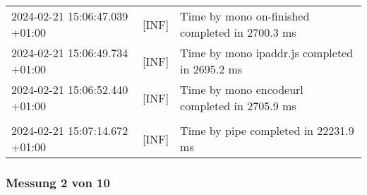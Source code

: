 {{\begin{tabularx}{\textwidth}{|l|l|X|}
                    2024-02-21 15:06:47.039 +01:00 & [INF] & Time by mono on-finished completed in 2700.3 ms \\
                    2024-02-21 15:06:49.734 +01:00 & [INF] & Time by mono ipaddr.js completed in 2695.2 ms \\
                    2024-02-21 15:06:52.440 +01:00 & [INF] & Time by mono encodeurl completed in 2705.9 ms \\
                    & & \\
                    2024-02-21 15:07:14.672 +01:00 & [INF] & Time by pipe completed in 22231.9 ms \\
                    \hline
                \end{tabularx}
            }
        }

    \subsubsection*{Messung 2 von 10} \label{subsubsec:LiteDbMehrPaketeAlsDb2von10}
